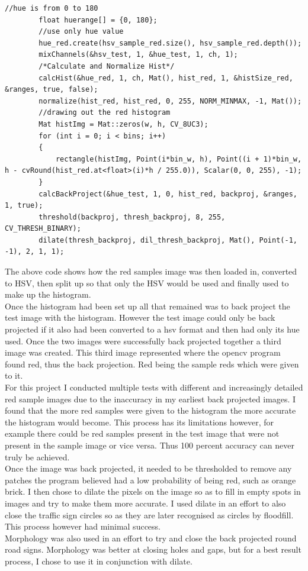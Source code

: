 \documentclass{article}
\begin{document}
\begin{lstlisting}
//hue is from 0 to 180
		float huerange[] = {0, 180};
		//use only hue value
		hue_red.create(hsv_sample_red.size(), hsv_sample_red.depth());
		mixChannels(&hsv_test, 1, &hue_test, 1, ch, 1);
		/*Calculate and Normalize Hist*/
		calcHist(&hue_red, 1, ch, Mat(), hist_red, 1, &histSize_red, &ranges, true, false);
		normalize(hist_red, hist_red, 0, 255, NORM_MINMAX, -1, Mat());
		//drawing out the red histogram
		Mat histImg = Mat::zeros(w, h, CV_8UC3);
		for (int i = 0; i < bins; i++)
		{
			rectangle(histImg, Point(i*bin_w, h), Point((i + 1)*bin_w, h - cvRound(hist_red.at<float>(i)*h / 255.0)), Scalar(0, 0, 255), -1);
		}
		calcBackProject(&hue_test, 1, 0, hist_red, backproj, &ranges, 1, true);	
		threshold(backproj, thresh_backproj, 8, 255, CV_THRESH_BINARY);
		dilate(thresh_backproj, dil_thresh_backproj, Mat(), Point(-1, -1), 2, 1, 1);
\end{lstlisting}
The above code shows how the red samples image was then loaded in, converted to HSV, then split up so that only the HSV would be used and finally used to make up the histogram.\\
Once the histogram had been set up all that remained was to back project the test image with the histogram. However the test image could only be back projected if it also had been converted to a hsv format and then had only its hue used. Once the two images were successfully back projected together a third image was created. This third image represented where the opencv program found red, thus the back projection. Red being the sample reds which were given to it. \\
For this project I conducted multiple tests with different and increasingly detailed red sample images due to the inaccuracy in my earliest back projected images. I found that the more red samples were given to the histogram the more accurate the histogram would become. This process has its limitations however, for example there could be red samples present in the test image that were not present in the sample image or vice versa. Thus 100 percent accuracy can never truly be achieved. \\
Once the image was back projected, it needed to be thresholded to remove any patches the program believed had a low probability of being red, such as orange brick. I then chose to dilate the pixels on the image so as to fill in empty spots in images and try to make them more accurate. I used dilate in an effort to also close the traffic sign circles so as they are later recognised as circles by floodfill. This process however had minimal success.\\
Morphology was also used in an effort to try and close the back projected round road signs. Morphology was better at closing holes and gaps, but for a best result process, I chose to use it in conjunction with dilate.\\
\end{document}
